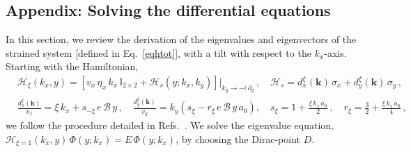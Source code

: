 \documentclass[aps,prb, onecolumn, nofootinbib, citeautoscript,10pt]{revtex4-2}
\newcommand{\bs}[1]{\boldsymbol{#1}}
\def \nn{\nonumber \\}
\begin{document}
\begin{widetext}
\section*{Appendix: Solving the differential equations}

In this section, we review the derivation of the eigenvalues and eigenvectors of the strained system [defined in Eq.~\eqref{eqhtot}], with a tilt with respect to the $k_x$-axis.
Starting with the Hamiltonian, 
\begin{align}
\label{eqhtotapp}
& \mathcal H_\xi (k_x, y) = \left[ 
 v_x \, \eta_x \, k_x \,  {\mathbb I}_{2\times 2}
 + \mathcal{H}_s(y; k_x, k_y) \right ]\big \vert_{k_y \rightarrow -i\, \partial_y}
\,, \quad 
\mathcal{H}_s  =   d^\xi_x (\bs k)\,\sigma_x +  d^\xi_y (\bs k)\,\sigma_y  \,, \nn &
\frac{ d^\xi_x(\boldsymbol{k}) } {v_x} = \xi \, k_x + s_{-\xi} \, e \, {\mathcal B} \, y\,,
\quad
\frac {d^\xi_y(\boldsymbol{k})} {v_y} =  k_y  \left(s_\xi - r_\xi \, e \, {\mathcal B} \, y\, a_0
\right )  ,
\quad s_\xi = 1 + \frac{\xi \, k_x\, a_0 } {2}\,, \quad
r_\xi = \frac{3}{2} + \frac{\xi \, k_x\, a_0 } {4} \,,
\end{align}
we follow the procedure detailed in Refs.~\cite{strained-dirac-franz, complex-LL-strained-graphene}. We solve the eigenvalue equation, $\mathcal H_{\xi=1} (k_x, y)\,\Phi (y; k_x) = E\, \Phi (y; k_x)$, by choosing the Dirac-point $D$. 



\end{widetext}
\end{document}
